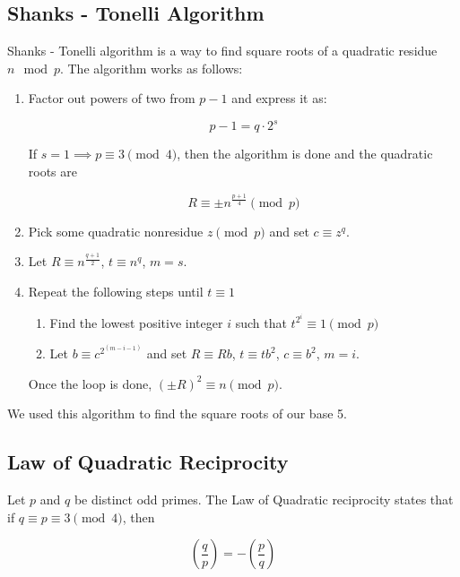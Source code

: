 \documentclass{article}
\begin{document}
\subsection{Shanks - Tonelli Algorithm}

Shanks - Tonelli algorithm is a way to find square roots of a quadratic residue $n \mod{p}$. The algorithm works as follows:

\begin{enumerate}

  \item Factor out powers of two from $p-1$ and express it as:

    $$p-1 = q \cdot 2^s$$

    If $s = 1 \implies p \equiv 3 \pmod{4}$, then the algorithm is done and the quadratic roots are

    $$R \equiv \pm n^{\frac{p+1}{4}} \pmod{p}$$

  \item Pick some quadratic nonresidue $z \pmod{p}$ and set $c \equiv z^q$.

  \item Let $R \equiv n^{\frac{q+1}{2}}$, $t \equiv n^q$, $m = s$.

  \item Repeat the following steps until $t \equiv 1$

    \begin{enumerate}
      \item Find the lowest positive integer $i$ such that $t^{2^i} \equiv 1 \pmod{p}$
      \item Let $b \equiv c^{2^{(m-i-1)}}$ and set $R \equiv Rb$, $t \equiv tb^2$, $c \equiv b^2$, $m = i$.
    \end{enumerate}

    Once the loop is done, $(\pm R)^2 \equiv n \pmod{p}$.

\end{enumerate}

We used this algorithm to find the square roots of our base 5.

\subsection{Law of Quadratic Reciprocity}

Let $p$ and $q$ be distinct odd primes. The Law of Quadratic reciprocity states that if $q \equiv p \equiv 3 \pmod{4}$, then

$$\left(\frac{q}{p}\right) = -\left(\frac{p}{q}\right)$$
\end{document}

